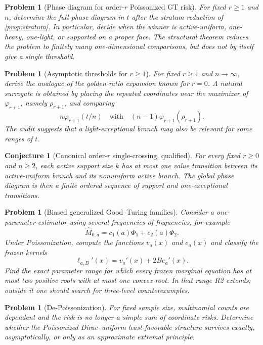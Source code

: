 \documentclass[11pt]{article}
\newtheorem{conjecture}[theorem]{Conjecture}
\newtheorem{problem}[theorem]{Problem}
\theoremstyle{definition}
\begin{document}
\begin{problem}[Phase diagram for order-$r$ Poissonized GT risk]
For fixed $r\ge1$ and $n$, determine the full phase diagram in $t$ after the stratum reduction of \cref{prop:stratum}.  In particular, decide when the winner is active-uniform, one-heavy, one-light, or supported on a proper face.  The structural theorem reduces the problem to finitely many one-dimensional comparisons, but does not by itself give a single threshold.
\end{problem}

\begin{problem}[Asymptotic thresholds for $r\ge1$]
For fixed $r\ge1$ and $n\to\infty$, derive the analogue of the golden-ratio expansion known for $r=0$.  A natural surrogate is obtained by placing the repeated coordinates near the maximizer of $\varphi_{r+1}$, namely $\rho_{r+1}$, and comparing
\[
  n\varphi_{r+1}(t/n)
  \quad\text{with}\quad
  (n-1)\varphi_{r+1}(\rho_{r+1}).
\]
The audit suggests that a light-exceptional branch may also be relevant for some ranges of $t$.
\end{problem}

\begin{conjecture}[Canonical order-$r$ single-crossing, qualified]
For every fixed $r\ge0$ and $n\ge2$, each active support size $k$ has at most one value transition between its active-uniform branch and its nonuniform active branch.  The global phase diagram is then a finite ordered sequence of support and one-exceptional transitions.
\end{conjecture}

\begin{problem}[Biased generalized Good--Turing families]
Consider a one-parameter estimator using several frequencies of frequencies, for example
\[
  \widehat M_{0,a}=c_1(a)\Phi_1+c_2(a)\Phi_2.
\]
Under Poissonization, compute the functions $v_a(x)$ and $e_a(x)$ and classify the frozen kernels
\[
  \ell_{a,B}'(x)=v_a'(x)+2B e_a'(x).
\]
Find the exact parameter range for which every frozen marginal equation has at most two positive roots with at most one convex root.  In that range R2 extends; outside it one should search for three-level counterexamples.
\end{problem}

\begin{problem}[De-Poissonization]
For fixed sample size, multinomial counts are dependent and the risk is no longer a simple sum of coordinate risks.  Determine whether the Poissonized Dirac--uniform least-favorable structure survives exactly, asymptotically, or only as an approximate extremal principle.
\end{problem}
\end{document}
